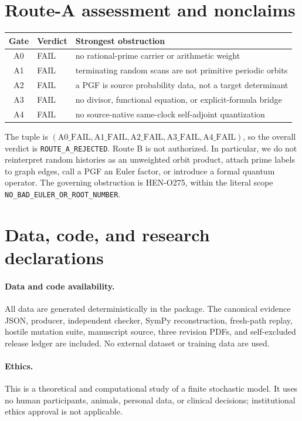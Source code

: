 \documentclass[10pt]{article}
\begin{document}
\section{Route-A assessment and nonclaims}
\begin{center}
\small
\begin{tabular}{@{}cll@{}}
\toprule
Gate & Verdict & Strongest obstruction \\
\midrule
A0 & FAIL & no rational-prime carrier or arithmetic weight \\
A1 & FAIL & terminating random scans are not primitive periodic orbits \\
A2 & FAIL & a PGF is source probability data, not a target determinant \\
A3 & FAIL & no divisor, functional equation, or explicit-formula bridge \\
A4 & FAIL & no source-native same-clock self-adjoint quantization \\
\bottomrule
\end{tabular}
\end{center}
The tuple is
$(\mathrm{A0\_FAIL},\mathrm{A1\_FAIL},\mathrm{A2\_FAIL},
\mathrm{A3\_FAIL},\mathrm{A4\_FAIL})$, so the overall verdict is
\texttt{ROUTE\_A\_REJECTED}.  Route B is not authorized.  In particular, we
do not reinterpret random histories as an unweighted orbit product, attach
prime labels to graph edges, call a PGF an Euler factor, or introduce a formal
quantum operator.  The governing obstruction is HEN-O275, within the literal
scope \texttt{NO\_BAD\_EULER\_OR\_ROOT\_NUMBER}.

\section{Data, code, and research declarations}
\paragraph{Data and code availability.}
All data are generated deterministically in the package.  The canonical
evidence JSON, producer, independent checker, SymPy reconstruction,
fresh-path replay, hostile mutation suite, manuscript source, three revision
PDFs, and self-excluded release ledger are included.  No external dataset or
training data are used.

\paragraph{Ethics.}
This is a theoretical and computational study of a finite stochastic model.
It uses no human participants, animals, personal data, or clinical decisions;
institutional ethics approval is not applicable.
\end{document}
